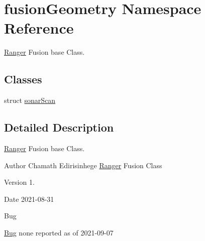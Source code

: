 \hypertarget{namespacefusionGeometry}{}\section{fusion\+Geometry Namespace Reference}
\label{namespacefusionGeometry}


\hyperlink{classRanger}{Ranger} Fusion base Class.  


\subsection*{Classes}
\begin{DoxyCompactItemize}
\item 
struct \hyperlink{structfusionGeometry_1_1sonarScan}{sonar\+Scan}
\end{DoxyCompactItemize}


\subsection{Detailed Description}
\hyperlink{classRanger}{Ranger} Fusion base Class. 

\begin{DoxyAuthor}{Author}
Chamath Edirisinhege \hyperlink{classRanger}{Ranger} Fusion Class 
\end{DoxyAuthor}
\begin{DoxyVersion}{Version}
1. 
\end{DoxyVersion}
\begin{DoxyDate}{Date}
2021-\/08-\/31 
\end{DoxyDate}
\begin{DoxyRefDesc}{Bug}
\item[\hyperlink{bug__bug000007}{Bug}]none reported as of 2021-\/09-\/07 \end{DoxyRefDesc}
